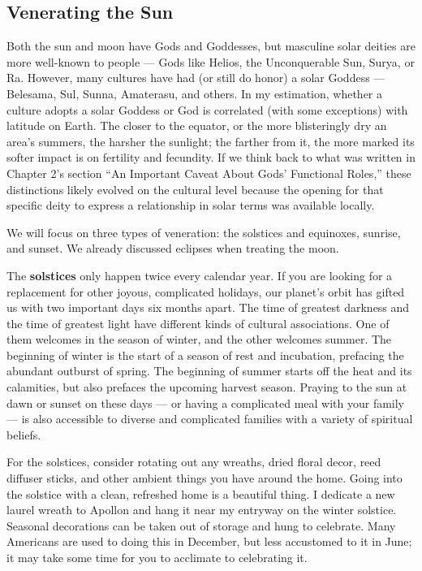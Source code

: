\documentclass[
]{book}
\begin{document}
\hypertarget{venerating-the-sun}{%
\subsection{Venerating the Sun}\label{venerating-the-sun}}

Both the sun and moon have Gods and Goddesses, but masculine solar deities are more well-known to people --- Gods like Helios, the Unconquerable Sun, Surya, or Ra. However, many cultures have had (or still do honor) a solar Goddess --- Belesama, Sul, Sunna, Amaterasu, and others. In my estimation, whether a culture adopts a solar Goddess or God is correlated (with some exceptions) with latitude on Earth. The closer to the equator, or the more blisteringly dry an area's summers, the harsher the sunlight; the farther from it, the more marked its softer impact is on fertility and fecundity. If we think back to what was written in Chapter 2's section ``An Important Caveat About Gods' Functional Roles,'' these distinctions likely evolved on the cultural level because the opening for that specific deity to express a relationship in solar terms was available locally.

We will focus on three types of veneration: the solstices and equinoxes, sunrise, and sunset. We already discussed eclipses when treating the moon.

The \textbf{solstices} only happen twice every calendar year. If you are looking for a replacement for other joyous, complicated holidays, our planet's orbit has gifted us with two important days six months apart. The time of greatest darkness and the time of greatest light have different kinds of cultural associations. One of them welcomes in the season of winter, and the other welcomes summer. The beginning of winter is the start of a season of rest and incubation, prefacing the abundant outburst of spring. The beginning of summer starts off the heat and its calamities, but also prefaces the upcoming harvest season. Praying to the sun at dawn or sunset on these days --- or having a complicated meal with your family --- is also accessible to diverse and complicated families with a variety of spiritual beliefs.

For the solstices, consider rotating out any wreaths, dried floral decor, reed diffuser sticks, and other ambient things you have around the home. Going into the solstice with a clean, refreshed home is a beautiful thing. I dedicate a new laurel wreath to Apollon and hang it near my entryway on the winter solstice. Seasonal decorations can be taken out of storage and hung to celebrate. Many Americans are used to doing this in December, but less accustomed to it in June; it may take some time for you to acclimate to celebrating it.
\end{document}
